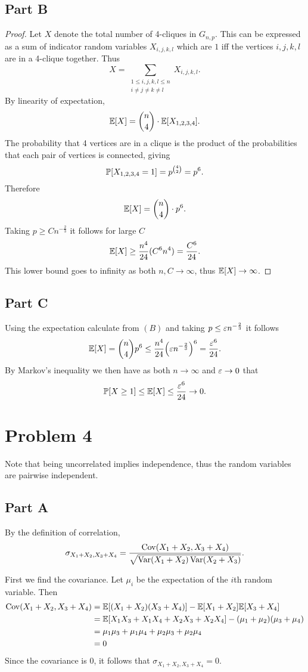 \documentclass{eeleyes}
\begin{document}
\subsection*{Part B}
\begin{proof}
    Let $X$ denote the total number of 4-cliques in $G_{n,p}$. This can be expressed as a sum of indicator random variables $X_{i,j,k,l}$ which are $1$ iff the vertices $i,j,k,l$ are in a 4-clique together. Thus
    \[
        X = \sum_{\substack{1 \leq i,j,k,l \leq n \\ i \neq j \neq k \neq l}} X_{i,j,k,l}
    .\]
    By linearity of expectation,
    \[
        \expp{X} = \binom{n}{4} \cdot \expp{X_{1,2,3,4}}
    .\]
    The probability that 4 vertices are in a clique is the product of the probabilities that each pair of vertices is connected, giving
    \[
        \prob{X_{1,2,3,4} = 1} = p^{\binom{4}{2}} = p^6
    .\]
    Therefore
    \[
        \expp{X} = \binom{n}{4} \cdot p^6
    .\]
    Taking $p \geq C n^{-\frac{2}{3}}$ it follows for large $C$
    \[
        \expp{X} \geq \frac{n^4}{24} (C^6 n^4) = \frac{C^6}{24}
    .\]
    This lower bound goes to infinity as both $n, C \to \infty$, thus $\expp{X} \to \infty$.
\end{proof}
\subsection*{Part C}
Using the expectation calculate from $(B)$ and taking $p \leq \varepsilon n^{-\frac{2}{3}}$ it follows
\[
    \expp{X} = \binom{n}{4} p^6 \leq \frac{n^4}{24} \qty(\eps n^{-\frac{2}{3}})^6 = \frac{\eps^6}{24}
.\]
By Markov's inequality we then have as both $n \to \infty$ and $\varepsilon \to 0$ that
\[
    \prob{X \geq 1} \leq \expp{X} \leq \frac{\eps^6}{24} \to 0
.\]

\section*{Problem 4}
Note that being uncorrelated implies independence, thus the random variables are pairwise independent. 

\subsection*{Part A}
By the definition of correlation,
\[
    \sigma_{X_1+X_2,X_3+X_4} = \frac{\operatorname{Cov}(X_1 + X_2, X_3 + X_4)}{\sqrt{\operatorname{Var}(X_1+X_2) \operatorname{Var}(X_2 + X_3)}} 
.\]

First we find the covariance. Let $\mu_i$ be the expectation of the $i$th random variable. Then
\begin{align*}
    \operatorname{Cov}(X_1+X_2, X_3+X_4) &= \expp{(X_1 + X_2)(X_3 + X_4)} - \expp{X_1 + X_2}\expp{X_3 + X_4} \\
                                         &= \expp{X_1 X_3 + X_1 X_4 + X_2 X_3 + X_2 X_4} - (\mu_1 + \mu_2)(\mu_3 + \mu_4) \\
                                         &= \mu_1 \mu_3 + \mu_1 \mu_4 + \mu_2 \mu_3 + \mu_2 \mu_4 \\
                                         &= 0
\end{align*}
Since the covariance is $0$, it follows that $\sigma_{X_1+X_2,X_3+X_4} = 0$.
\end{document}
